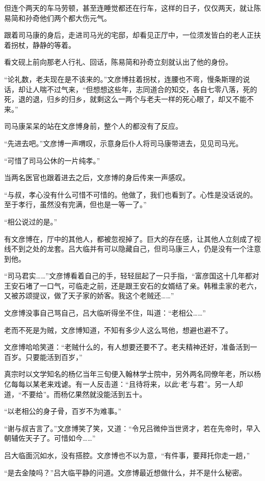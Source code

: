 但连个两天的车马劳顿，甚至连睡觉都还在行车，这样的日子，仅仅两天，就让陈易简和孙奇他们两个都大伤元气。

跟着司马康的身后，走进司马光的宅邸，却看见正厅中，一位须发皆白的老人正扶着拐杖，静静的等着。

看文砚上前向那老人行礼、回话，陈易简和孙奇立刻就认出了他的身份。

“论礼数，老夫现在是不该来的。”文彦博拄着拐杖，连腰也不弯，慢条斯理的说话，却让人喘不过气来，“但想想这些年，志同道合的知交，各自七零八落，死的死，退的退，归乡的归乡，就剩这么一两个与老夫一样的死心眼了，却又不能不来。”

司马康呆呆的站在文彦博身前，整个人的都没有了反应。

“先进去吧。”文彦博一声喟叹，示意身后仆人将司马康带进去，见见司马光。

“可惜了司马公休的一片纯孝。”

当两名医官也跟着进去之后，文彦博的身后传来一声感叹。

“与叔，孝心没有什么可惜不可惜的。他做了，我们也看到了。心性是没话说的。至于孝行，虽然没有完满，但也是一等一了。”

“相公说过的是。”

有文彦博在，厅中的其他人，都被忽视掉了。巨大的存在感，让其他人立刻成了视线不到之处的龙套。吕大临并有可以隐藏自己，但司马康三人，仍是没有一个注意到他。

“司马君实……”文彦博看着自己的手，轻轻屈起了一只手指，“富彦国这十几年都对王安石堵了一口气，可临走之前，还是跟王安石的女婿结了亲。韩稚圭家的老六，又被苏颂提议，做了天子家的娇客。我这个老贼还……”

文彦博没事自己骂自己，吕大临听得坐不住，叫道：“老相公……”

老而不死是为贼，文彦博知道，不知有多少人这么骂他，想避也避不了。

文彦博哈哈笑道：“老贼什么的，有人想要还要不了。老夫精神还好，准备活到一百岁。只要能活到百岁，”

真宗时以文学知名的杨亿当年三旬便入翰林学士院中，另外两名同僚年老，所以杨亿每每以某老来戏谑。有一人反击道：“且待将来，以此‘老’与君”。另一人却道，“不要给”。而杨亿果然就没能活到五十。

“以老相公的身子骨，百岁不为难事。”

“谢与叔吉言了。”文彦博笑了笑，又道：“令兄吕微仲当世贤才，若在先帝时，早入朝辅佐天子了。可惜如今……”

吕大临面沉如水，没有搭腔。文彦博也不以为意，“有件事，要拜托你走一趟，”

“是去金陵吗？”吕大临平静的问道。文彦博最近想做什么，并不是什么秘密。

